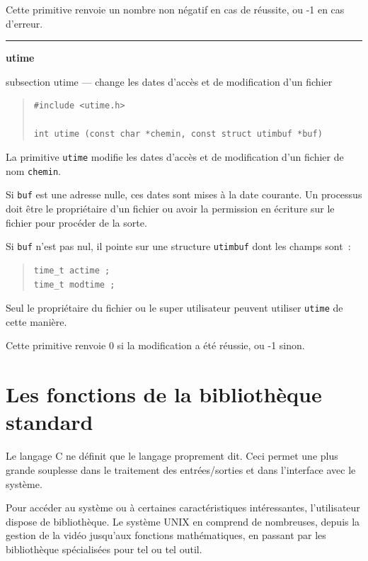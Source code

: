 \documentclass [twoside] {report}
\newcommand {\primitive} [1]
    {
	\phantomsection
	{\large \textbf {#1}}
	\addcontentsline {toc} {subsection} {#1}
    }
\newcommand {\separation}
    {
	\vspace {5mm}
	\nopagebreak
	\hrule
    }
\begin{document}
Cette primitive renvoie un nombre non négatif en
cas de réussite, ou -1 en cas d'erreur.




\separation
\primitive {utime} --- change les dates d'accès et de modification d'un fichier

\begin {quote}
\begin {verbatim}
#include <utime.h>

int utime (const char *chemin, const struct utimbuf *buf)
\end{verbatim}
\end {quote}

La primitive \texttt {utime} modifie les dates d'accès
et de modification d'un fichier de nom \texttt {chemin}.

Si \texttt {buf} est une adresse nulle, ces dates sont
mises à la date courante. Un processus doit être
le propriétaire d'un fichier ou avoir la
permission en écriture sur le fichier pour
procéder de la sorte.

Si \texttt {buf} n'est pas nul, il pointe sur une
structure \texttt {utimbuf} dont les champs sont~:

\begin {quote}
\begin {verbatim}
time_t actime ;
time_t modtime ;
\end{verbatim}
\end {quote}

Seul le propriétaire du fichier ou le super
utilisateur peuvent utiliser \texttt {utime} de cette
manière.

Cette primitive renvoie 0 si la modification a
été réussie, ou -1 sinon.



\cleardoublepage

\chapter {Les fonctions de la bibliothèque standard}


Le langage C ne définit que le langage proprement dit. Ceci
permet une plus grande souplesse dans le traitement des
entrées/sorties et dans l'interface avec le système.

Pour accéder au système ou à certaines caractéristiques
intéressantes, l'utilisateur dispose de bibliothèque. Le
système UNIX en comprend de nombreuses, depuis la gestion de
la vidéo jusqu'aux fonctions mathématiques, en passant par
les bibliothèque spécialisées pour tel ou tel outil.
\end{document}
